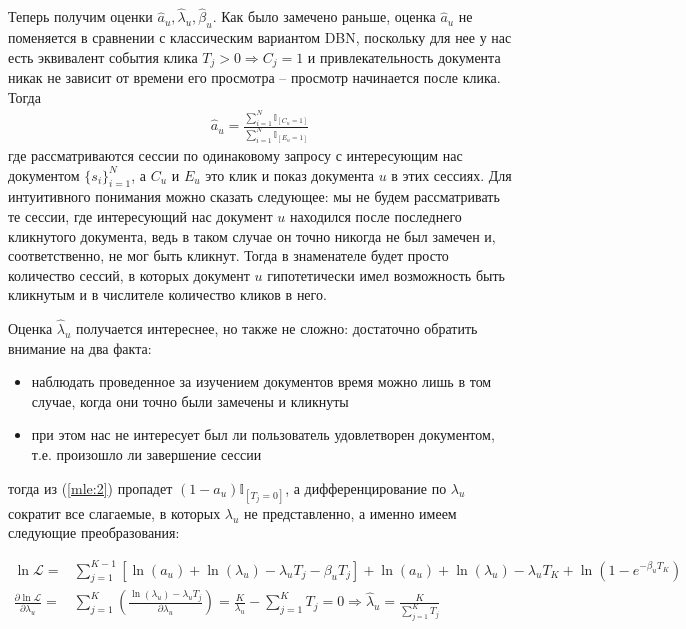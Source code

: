 \documentclass[diploma]{nanolab2015}
\begin{document}
Теперь получим оценки $\hat{a}_u, \hat{\lambda}_u, \hat{\beta}_u$. Как было замечено раньше, оценка $\hat{a}_u$ не поменяется в сравнении с классическим вариантом DBN, поскольку для нее у нас есть эквивалент события клика $T_j > 0 \Rightarrow C_j = 1$ и привлекательность документа никак не зависит от времени его просмотра -- просмотр начинается после клика. Тогда
\begin{align}
    \hat{a}_u = \frac{\sum\limits_{i=1}^{N}\mathbb{I}_{[C_u = 1]}}{\sum\limits_{i=1}^{N}\mathbb{I}_{[E_u = 1]}} 
\end{align}
где рассматриваются сессии по одинаковому запросу с интересующим нас документом $\{s_i\}_{i=1}^{N}$, а $C_u$ и $E_u$ это клик и показ документа $u$ в этих сессиях. Для интуитивного понимания можно сказать следующее: мы не будем рассматривать те сессии, где интересующий нас документ $u$ находился после последнего кликнутого документа, ведь в таком случае он точно никогда не был замечен и, соответственно, не мог быть кликнут. Тогда в знаменателе будет просто количество сессий, в которых документ $u$ гипотетически имел возможность быть кликнутым и в числителе количество кликов в него.

Оценка $\hat{\lambda}_u$ получается интереснее, но также не сложно: достаточно обратить внимание на два факта:
\begin{itemize}
    \item наблюдать проведенное за изучением документов время можно лишь в том случае, когда они точно были замечены и кликнуты
    \item при этом нас не интересует был ли пользователь удовлетворен документом, т.е. произошло ли завершение сессии
\end{itemize}

тогда из (\ref{mle:2}) пропадет $(1-a_u)\mathbb{I}_{[T_j=0]}$, а дифференцирование по $\lambda_u$ сократит все слагаемые, в которых $\lambda_u$ не представленно, а именно имеем следующие преобразования:

\begin{align}
    \ln\mathcal{L} = & \sum_{j=1}^{K-1} \left[ \ln(a_u) + \ln(\lambda_u) - \lambda_u T_j - \beta_u T_j \right] + \ln(a_u) + \ln(\lambda_u) - \lambda_u T_K + \ln(1-e^{-\beta_u T_K}) \\
    \frac{\partial \ln \mathcal{L}}{\partial \lambda_u} = & \sum_{j=1}^{K} \left( \frac{\ln(\lambda_u) - \lambda_u T_j}{\partial \lambda_u} \right) = \frac{K}{\lambda_u} - \sum_{j=1}^{K}T_j = 0 \Rightarrow \hat{\lambda}_u = \frac{K}{\sum_{j=1}^{K}T_j}
\end{align}
\end{document}
